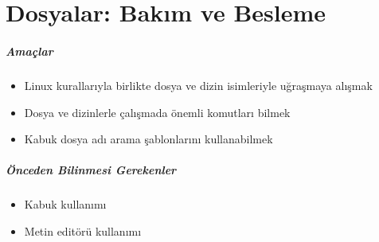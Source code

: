 \chapter{Dosyalar: Bakım ve Besleme}
\paragraph{Amaçlar}
\begin{itemize}
 \item Linux kurallarıyla birlikte dosya ve dizin isimleriyle uğraşmaya alışmak
 \item Dosya ve dizinlerle çalışmada önemli komutları bilmek
 \item Kabuk dosya adı arama şablonlarını kullanabilmek
 \end{itemize}
 
\paragraph{Önceden Bilinmesi Gerekenler}
\begin{itemize}
 \item Kabuk kullanımı
 \item Metin editörü kullanımı
 \end{itemize}

